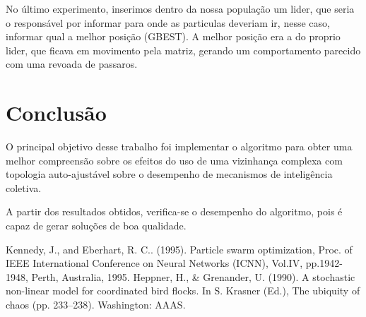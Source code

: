 \documentclass[conference]{IEEEtran}
\begin{document}
    No último experimento, inserimos dentro da nossa população um lider, que seria o responsável por informar para onde as particulas deveriam ir, nesse caso, informar qual a melhor posição (GBEST). A melhor posição era a do proprio lider, que ficava em movimento pela matriz, gerando um comportamento parecido com uma revoada de passaros.
    
\section*{Conclusão}

    O principal objetivo desse trabalho foi implementar o algoritmo para obter uma melhor compreensão sobre os efeitos do uso de uma vizinhança complexa com topologia auto-ajustável sobre o desempenho de mecanismos de inteligência coletiva. 
    
    A partir dos resultados obtidos, verifica-se o desempenho do algoritmo, pois é capaz de gerar soluções de boa qualidade.

\begin{thebibliography}{00}

 Kennedy, J., and Eberhart, R. C.. (1995). Particle swarm optimization, Proc. of IEEE International Conference on Neural Networks (ICNN), Vol.IV, pp.1942-1948, Perth, Australia, 1995.
 Heppner, H., \& Grenander, U. (1990). A stochastic non-linear model for coordinated bird flocks. In S. Krasner
(Ed.), The ubiquity of chaos (pp. 233–238). Washington: AAAS.
\end{thebibliography}
\vspace{12pt}
\end{document}
